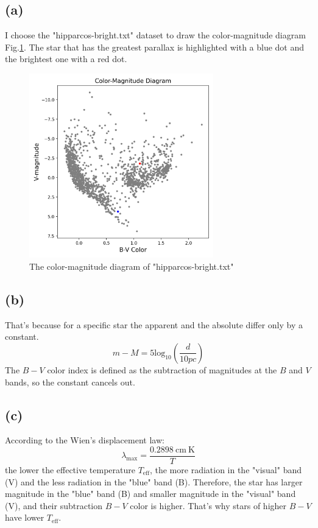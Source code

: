 \documentclass[a4paper,12pt]{article}
\begin{document}
\subsection*{(a)}
I choose the "hipparcos-bright.txt" dataset to draw the 
color-magnitude diagram Fig.\ref{fig1}. The star that has the greatest parallax is 
highlighted with a blue dot and the brightest one with a red dot.
\begin{figure}[htbp]
    \centering
    \includegraphics[width=8cm]{color_mag.png}
    \caption{The color-magnitude diagram of "hipparcos-bright.txt"}
    \label{fig1}
\end{figure}

\subsection*{(b)}
That's because for a specific star the apparent and the absolute 
differ only by a constant.
\begin{equation}
    m-M = 5 \text{log}_{10}(\frac{d}{10pc})
\end{equation}
The $B-V$ color index is defined as 
the subtraction of magnitudes at the $B$ and $V$ bands, so the constant 
cancels out.

\subsection*{(c)}
According to the Wien's displacement law:
\begin{equation}
    \lambda_{\text{max}} = \frac{0.2898 \ \text{cm} \ \text{K}}{T}
\end{equation}
the lower the effective temperature $T_{\text{eff}}$, the more radiation 
in the "visual" band (V) and the less radiation in the "blue" band (B). 
Therefore, the star has larger magnitude in the "blue" band (B) 
and smaller magnitude in the "visual" band (V), and their subtraction $B-V$ 
color is higher. That's why stars of higher $B-V$ have lower $T_{\text{eff}}$.
\end{document}
